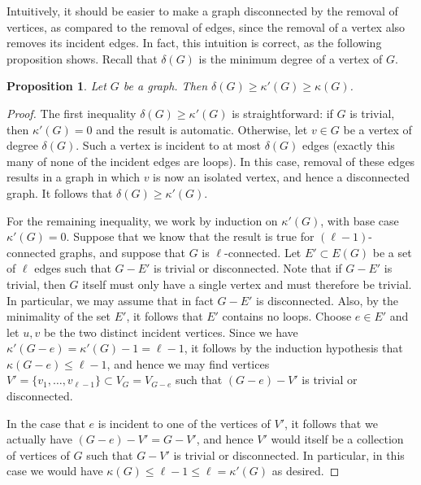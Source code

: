\documentclass[12pt]{report}
\theoremstyle{plain}
\newtheorem{prop}[thm]{Proposition}
\begin{document}
Intuitively, it should be easier to make a graph disconnected by the
removal of vertices, as compared to the removal of edges, since the removal
of a vertex also removes its incident edges. In fact, this intuition is
correct, as the following proposition shows. Recall that $\delta(G)$ is the
minimum degree of a vertex of $G$.

\begin{prop}
Let $G$ be a graph. Then $\delta(G) \geq \kappa'(G) \geq \kappa(G)$.
\end{prop}
\begin{proof}
The first inequality $\delta(G) \geq \kappa'(G)$ is straightforward: if $G$
is trivial, then $\kappa'(G) = 0$ and the result is automatic. Otherwise,
let $v \in G$ be a vertex of degree $\delta(G)$. Such a vertex is incident
to at most $\delta(G)$ edges (exactly this many of none of the incident
edges are loops). In this case, removal of these edges results in a graph
in which $v$ is now an isolated vertex, and hence a disconnected graph. It
follows that $\delta(G) \geq \kappa'(G)$.

For the remaining inequality, we work by induction on $\kappa'(G)$, with
base case $\kappa'(G) = 0$. 
Suppose that we know that the result is true for
$(\ell - 1)$-connected graphs, and suppose that $G$ is $\ell$-connected.
Let $E' \subset E(G)$ be a set of $\ell$ edges such that $G - E'$ is
trivial or disconnected. Note that if $G - E'$ is trivial, then $G$ itself
must only have a single vertex and must therefore be trivial. In
particular, we may assume that in fact $G - E'$ is disconnected. Also, by
the minimality of the set $E'$, it follows that $E'$ contains no loops.
Choose $e \in E'$ and let $u, v$ be the two distinct incident vertices.
Since we have $\kappa'(G - e) = \kappa'(G) - 1 = \ell - 1$, it follows by
the induction hypothesis that $\kappa(G - e) \leq \ell - 1$, and hence we
may find vertices $V' = \{v_1, \ldots, v_{\ell
- 1}\} \subset V_G = V_{G - e}$ such that $(G - e) - V'$ is trivial or
disconnected.

In the case that $e$ is incident to one of the vertices of $V'$, it follows
that we actually have $(G - e) - V' = G - V'$, and hence $V'$ would itself
be a collection of vertices of $G$ such that $G - V'$ is trivial or
disconnected. In particular, in this case we would have $\kappa(G) \leq
\ell - 1 \leq \ell = \kappa'(G)$ as desired.


\end{proof}
\end{document}
